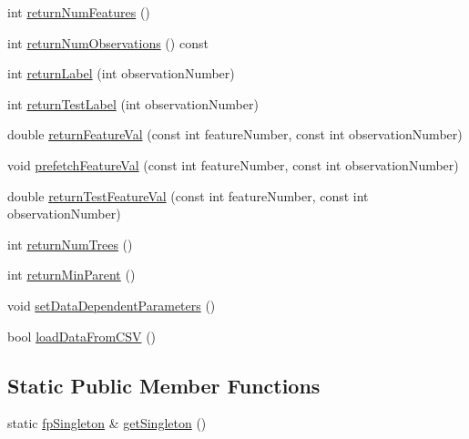 \begin{DoxyCompactItemize}
\item 
int \hyperlink{classfp_1_1fpSingleton_a97cbcad5ae9daa8c747fd4db84928c20}{return\+Num\+Features} ()
\item 
int \hyperlink{classfp_1_1fpSingleton_ae0a2963feb07b809b8740218f1048b67}{return\+Num\+Observations} () const
\item 
int \hyperlink{classfp_1_1fpSingleton_aa2f644b1521948fb994f4087ddfaea14}{return\+Label} (int observation\+Number)
\item 
int \hyperlink{classfp_1_1fpSingleton_ac0d2a2fd5ed471c8d507dfd544c12e6d}{return\+Test\+Label} (int observation\+Number)
\item 
double \hyperlink{classfp_1_1fpSingleton_aacc2eb894a219e2fe234743b51fa1a76}{return\+Feature\+Val} (const int feature\+Number, const int observation\+Number)
\item 
void \hyperlink{classfp_1_1fpSingleton_ab789c4e4bfb3248711a5857015008f8d}{prefetch\+Feature\+Val} (const int feature\+Number, const int observation\+Number)
\item 
double \hyperlink{classfp_1_1fpSingleton_ad74b421d65b17ba924244bff31fc9db6}{return\+Test\+Feature\+Val} (const int feature\+Number, const int observation\+Number)
\item 
int \hyperlink{classfp_1_1fpSingleton_a8be36616345b6b77ce4c60b99cc2b91c}{return\+Num\+Trees} ()
\item 
int \hyperlink{classfp_1_1fpSingleton_a2d06406b6462099e0adb393218090420}{return\+Min\+Parent} ()
\item 
void \hyperlink{classfp_1_1fpSingleton_a3edf17209500e72c76ef816e32666eb2}{set\+Data\+Dependent\+Parameters} ()
\item 
bool \hyperlink{classfp_1_1fpSingleton_a12178de58f19494062efe5255d937171}{load\+Data\+From\+C\+SV} ()
\end{DoxyCompactItemize}
\subsection*{Static Public Member Functions}
\begin{DoxyCompactItemize}
\item 
static \hyperlink{classfp_1_1fpSingleton}{fp\+Singleton} \& \hyperlink{classfp_1_1fpSingleton_a8bdae77b68521003e3fc630edec2e240}{get\+Singleton} ()
\end{DoxyCompactItemize}
